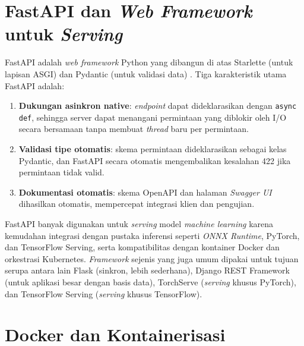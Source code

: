 \section{FastAPI dan \textit{Web Framework} untuk \textit{Serving}}
\label{sec:fastapi}

FastAPI adalah \textit{web framework} Python yang dibangun di atas Starlette (untuk lapisan ASGI) dan Pydantic (untuk validasi data) \citep{fastapidoc2024}. Tiga karakteristik utama FastAPI adalah:

\begin{enumerate}
    \item \textbf{Dukungan asinkron native}: \textit{endpoint} dapat dideklarasikan dengan \texttt{async def}, sehingga server dapat menangani permintaan yang diblokir oleh I/O secara bersamaan tanpa membuat \textit{thread} baru per permintaan.
    \item \textbf{Validasi tipe otomatis}: skema permintaan dideklarasikan sebagai kelas Pydantic, dan FastAPI secara otomatis mengembalikan kesalahan 422 jika permintaan tidak valid.
    \item \textbf{Dokumentasi otomatis}: skema OpenAPI dan halaman \textit{Swagger UI} dihasilkan otomatis, mempercepat integrasi klien dan pengujian.
\end{enumerate}

FastAPI banyak digunakan untuk \textit{serving} model \textit{machine learning} karena kemudahan integrasi dengan pustaka inferensi seperti \textit{ONNX Runtime}, PyTorch, dan TensorFlow Serving, serta kompatibilitas dengan kontainer Docker dan orkestrasi Kubernetes. \textit{Framework} sejenis yang juga umum dipakai untuk tujuan serupa antara lain Flask (sinkron, lebih sederhana), Django REST Framework (untuk aplikasi besar dengan basis data), TorchServe (\textit{serving} khusus PyTorch), dan TensorFlow Serving (\textit{serving} khusus TensorFlow).

\section{Docker dan Kontainerisasi}
\label{sec:docker}

